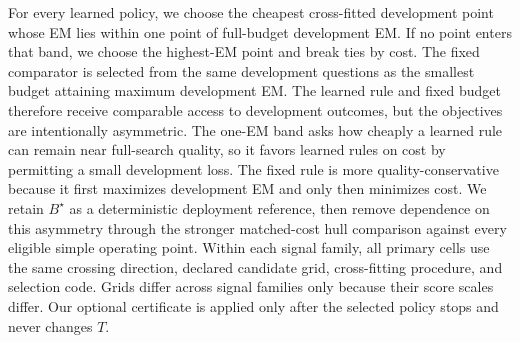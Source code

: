 For every learned policy, we choose the cheapest cross-fitted development
point whose EM lies within one point of full-budget development EM. If no
point enters that band, we choose the highest-EM point and break ties by cost.
The fixed comparator is selected from the same development questions as the
smallest budget attaining maximum development EM. The learned rule and fixed
budget therefore receive comparable access to development outcomes, but the
objectives are intentionally asymmetric. The one-EM band asks how cheaply a
learned rule can remain near full-search quality, so it favors learned rules
on cost by permitting a small development loss. The fixed rule is more
quality-conservative because it first maximizes development EM and only then
minimizes cost. We retain $B^\star$ as a deterministic deployment reference,
then remove dependence on this asymmetry through the stronger matched-cost
hull comparison against every eligible simple operating point. Within each
signal family, all primary cells use the same crossing direction, declared
candidate grid, cross-fitting procedure, and selection code. Grids differ
across signal families only because their score scales differ. Our optional
certificate is applied only after the selected policy stops and never changes
$T$.
